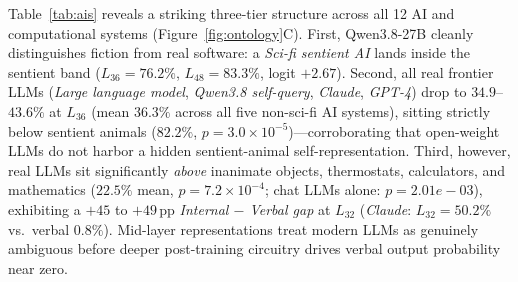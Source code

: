 \documentclass[10pt,twocolumn]{article}
\begin{document}
Table~\ref{tab:ais} reveals a striking three-tier structure across all 12 AI and computational systems (Figure~\ref{fig:ontology}C). First, Qwen3.8-27B cleanly distinguishes fiction from real software: a \emph{Sci-fi sentient AI} lands inside the sentient band ($L_{36} = 76.2\%$, $L_{48} = 83.3\%$, logit $+2.67$). Second, all real frontier LLMs (\emph{Large language model}, \emph{Qwen3.8 self-query}, \emph{Claude}, \emph{GPT-4}) drop to $34.9$--$43.6\%$ at $L_{36}$ (mean $36.3\%$ across all five non-sci-fi AI systems), sitting strictly below sentient animals ($82.2\%$, $p = 3.0\times 10^{-5}$)---corroborating \citet{kaiser2026selfsentience} that open-weight LLMs do not harbor a hidden sentient-animal self-representation. Third, however, real LLMs sit significantly \emph{above} inanimate objects, thermostats, calculators, and mathematics ($22.5\%$ mean, $p = 7.2\times 10^{-4}$; chat LLMs alone: $p = 2.01e-03$), exhibiting a $+45$ to $+49$\,pp \emph{Internal $-$ Verbal gap} at $L_{32}$ (\emph{Claude}: $L_{32} = 50.2\%$ vs.\ verbal $0.8\%$). Mid-layer representations treat modern LLMs as genuinely ambiguous before deeper post-training circuitry drives verbal output probability near zero.
\end{document}
